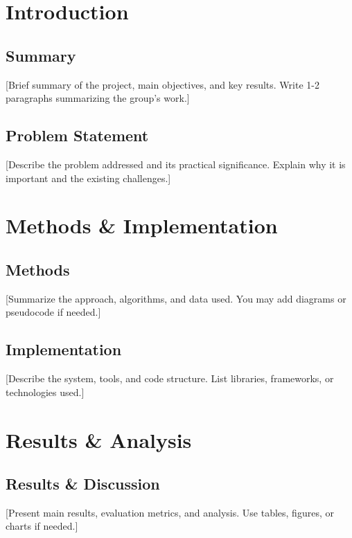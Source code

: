 \documentclass[a4paper]{book}
\begin{document}
\listoffigures %

\listoftables %

\tableofcontents
\clearpage

\chapter{Introduction}

\section{Summary}
[Brief summary of the project, main objectives, and key results. Write 1-2 paragraphs summarizing the group's work.]

\section{Problem Statement}
[Describe the problem addressed and its practical significance. Explain why it is important and the existing challenges.]

\chapter{Methods \& Implementation}

\section{Methods}
[Summarize the approach, algorithms, and data used. You may add diagrams or pseudocode if needed.]

\section{Implementation}
[Describe the system, tools, and code structure. List libraries, frameworks, or technologies used.]

\chapter{Results \& Analysis}

\section{Results \& Discussion}
[Present main results, evaluation metrics, and analysis. Use tables, figures, or charts if needed.]
\end{document}
